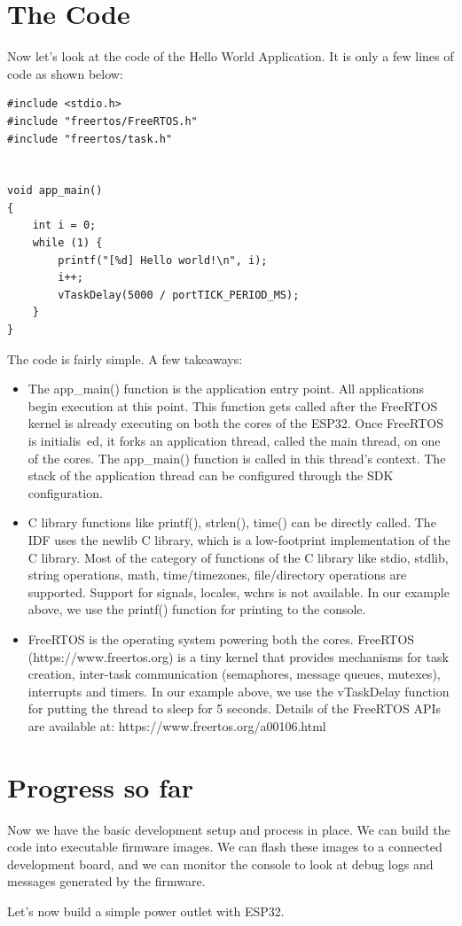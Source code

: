 \documentclass[main.tex]{subfiles}
\begin{document}
\section{The Code}
Now let's look at the code of the Hello World Application. It is only a few lines of code as shown below:
\begin{verbatim}
#include <stdio.h>
#include "freertos/FreeRTOS.h"
#include "freertos/task.h"


void app_main()
{
    int i = 0;
    while (1) {
        printf("[%d] Hello world!\n", i);
        i++;
        vTaskDelay(5000 / portTICK_PERIOD_MS);
    }
}
\end{verbatim}
The code is fairly simple. A few takeaways:
\begin{itemize}
\item The app\_main() function is the application entry point. All applications begin execution at this point. This function gets called after the FreeRTOS kernel is already executing on both the cores of the ESP32. Once FreeRTOS is initialis\
ed, it forks an application thread, called the main thread, on one of the cores. The app\_main() function is called in this thread's context. The stack of the application thread can be configured through the SDK configuration.
\item C library functions like printf(), strlen(), time() can be directly called. The IDF uses the newlib C library, which is a low-footprint implementation of the C library. Most of the category of functions of the C library like stdio, stdlib, string operations, math, time/timezones, file/directory operations are supported. Support for signals, locales, wchrs is not available. In our example above, we use the printf() function for printing to the console.
\item FreeRTOS is the operating system powering both the cores. FreeRTOS (https://www.freertos.org) is a tiny kernel that provides mechanisms for task creation, inter-task communication (semaphores, message queues, mutexes), interrupts and timers. In our example above, we use the vTaskDelay function for putting the thread to sleep for 5 seconds. Details of the FreeRTOS APIs are available at: https://www.freertos.org/a00106.html
\end{itemize}

\section{Progress so far}
Now we have the basic development setup and process in place. We can build the code into executable firmware images. We can flash these images to a connected development board, and we can monitor the console to look at debug logs and messages generated by the firmware. 

Let's now build a simple power outlet with ESP32.
\end{document}
